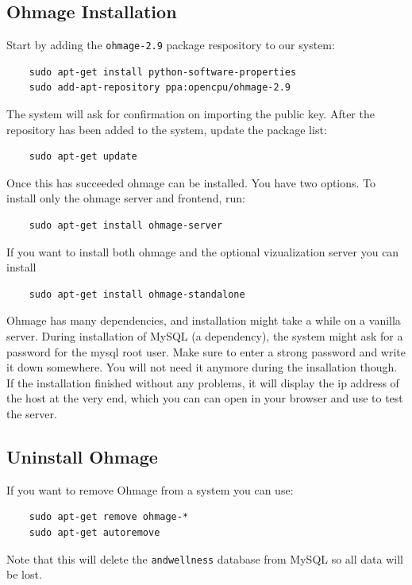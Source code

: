 \documentclass{scrartcl}
\begin{document}
\subsection{Ohmage Installation}

Start by adding the \texttt{ohmage-2.9} package respository to our system:

\begin{verbatim}
    sudo apt-get install python-software-properties
    sudo add-apt-repository ppa:opencpu/ohmage-2.9
\end{verbatim}
The system will ask for confirmation on importing the public key. After the
repository has been added to the system, update the package list:

\begin{verbatim}
    sudo apt-get update
\end{verbatim}
Once this has succeeded ohmage can be installed. You have two options. To
install only the ohmage server and frontend, run:

\begin{verbatim}
    sudo apt-get install ohmage-server
\end{verbatim}
If you want to install both ohmage and the optional vizualization server you can
install

\begin{verbatim}
    sudo apt-get install ohmage-standalone
\end{verbatim}
Ohmage has many dependencies, and installation might take a while on a vanilla
server. During installation of MySQL (a dependency), the system might ask for a
password for the mysql root user. Make sure to enter a strong password and write
it down somewhere. You will not need it anymore during the insallation though.\\

\noindent If the installation finished without any problems, it will display the
ip address of the host at the very end, which you can can open in your browser and use to test the server.

\subsection{Uninstall Ohmage}

If you want to remove Ohmage from a system you can use:

\begin{verbatim}
    sudo apt-get remove ohmage-*
    sudo apt-get autoremove
\end{verbatim}
Note that this will delete the \texttt{andwellness} database from MySQL so all
data will be lost.
\end{document}
